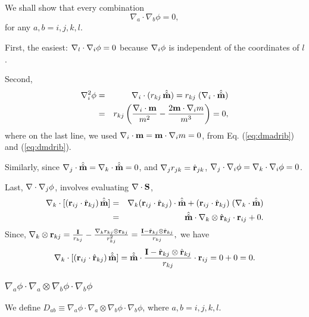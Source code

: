 \documentclass{article}
\begin{document}
We shall show that every combination
\begin{equation} 
\nabla_a \cdot \nabla_b \phi = 0,
\end{equation}
for any $a, b = i, j, k, l$.

First, the easiest: $\nabla_l \cdot \nabla_i \phi = 0$
because $\nabla_i \phi$ is independent of the coordinates of $l$.


Second,
\begin{eqnarray*}
\nabla_i^2 \phi   
&=& \nabla_i \cdot (r_{kj} \, \hat{\hat{\mathbf{m}}}) 
 =  r_{kj} \; ( \nabla_i \cdot \hat{\hat{\mathbf{m}}} ) \\
&=& r_{kj} 
  \left(
    \frac {\nabla_i \cdot \mathbf{m}} {m^2} 
    - \frac {2 \mathbf{m} \cdot \nabla_i m} {m^3}
  \right) = 0,
\end{eqnarray*}
where on the last line, we used
$\nabla_i \cdot \mathbf{m} = \mathbf{m} \cdot \nabla_i m = 0$,
from Eq. (\ref{eq:dmadrib}) and (\ref{eq:dmdrib}).


Similarly, since
$\nabla_j \cdot \hat{\hat{\mathbf{m}}} = \nabla_k \cdot \hat{\hat{\mathbf{m}}} = 0$,
and
$\nabla_j r_{jk} = \hat{\mathbf{r}}_{jk}$,
%
$\nabla_j \cdot \nabla_i \phi = \nabla_k \cdot \nabla_i \phi = 0$.
%

Last, $\nabla \cdot \nabla_j \phi$, involves evaluating $\nabla \cdot \mathbf{S}$,
\begin{eqnarray*}
\nabla_k \cdot [ ( \mathbf{r}_{ij} \cdot \hat{\mathbf{r}}_{kj}) \, \hat{\hat{\mathbf{m}}}]
&=& 
\nabla_k ( \mathbf{r}_{ij} \cdot \hat{\mathbf{r}}_{kj}) \cdot \hat{\hat{\mathbf{m}}}
+
( \mathbf{r}_{ij} \cdot \hat{\mathbf{r}}_{kj}) \; (\nabla_k \cdot \hat{\hat{\mathbf{m}}}) \\
&=& 
\hat{\hat{\mathbf{m}}} \cdot \nabla_k \otimes \hat{\mathbf{r}}_{kj} \cdot \mathbf{r}_{ij}
+ 0.
\end{eqnarray*}
%
Since,
$ \nabla_k \otimes \mathbf{r}_{kj} 
= \frac {\mathbf I} { r_{kj}}
- \frac { \nabla_k r_{kj} \otimes \mathbf{r}_{kj} }{ r_{kj}^2} 
= \frac { {\mathbf I - \hat{\mathbf{r}}_{kj} \otimes \hat{\mathbf{r}}_{kj}} } { r_{kj}},$
%
we have
\begin{eqnarray*}
\nabla_k \cdot [ ( \mathbf{r}_{ij} \cdot \hat{\mathbf{r}}_{kj}) \, \hat{\hat{\mathbf{m}}}]
=
\hat{\hat{\mathbf{m}}} \cdot \frac { {\mathbf I - \hat{\mathbf{r}}_{kj} \otimes \hat{\mathbf{r}}_{kj}} } { r_{kj}} \cdot \mathbf{r}_{ij} 
= 0 + 0 = 0.
\end{eqnarray*}



\subsubsection{$\nabla_a \phi \cdot \nabla_a \otimes \nabla_b \phi \cdot \nabla_b \phi$}
We define 
$D_{ab} \equiv \nabla_a \phi \cdot \nabla_a \otimes \nabla_b \phi \cdot \nabla_b \phi$, 
where $a, b = i, j, k, l$.
\end{document}
